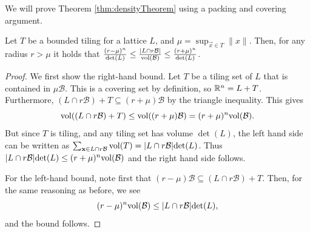 We will prove Theorem \ref{thm:densityTheorem} using a packing and covering argument. 



\begin{proposition}\label{prop:packingArgument} Let $T$ be a bounded tiling for a lattice $L$, and $\mu = \sup_{\vec x \in T} \|x\|$. Then, for any radius $r > \mu$ it holds that $\frac{ (r-\mu)^n}{\mathrm{det}(L)} \leq \frac {|L \cap r\mathcal B|} {\mathrm{vol}(\mathcal B)} \leq \frac{ (r+\mu)^n}{\mathrm{det}(L)}$.
\end{proposition}
\begin{proof} %
We first show the right-hand bound.
Let $T$ be a tiling set of $L$ that is contained in $\mu\mathcal{B}$.
This is a covering set by definition, so $\mathbb{R}^n = L + T$.
Furthermore, $(L \cap r\mathcal{B})+ T \subseteq (r+\mu)\mathcal{B}$ by the triangle inequality.
This gives \[\mathrm{vol}((L \cap r\mathcal{B})+ T) \leq \mathrm{vol}( (r+\mu)\mathcal{B}) = (r + \mu)^n \mathrm{vol} (\mathcal{B}).\]
But since $T$ is tiling, and any tiling set has volume $\det(L)$, the left hand side can be written as $\sum_{\mathbf{x} \in L \cap r\mathcal{B} } \mathrm{vol} (T) = |L \cap r\mathcal{B}| \mathrm{det}(L)$.
Thus $|L \cap r\mathcal{B}| \mathrm{det}(L) \leq  (r + \mu)^n \mathrm{vol} (\mathcal{B})$ and the right hand side follows.

For the left-hand bound, note first that $(r - \mu)\mathcal{B} \subseteq (L \cap r\mathcal{B})+ T$.
Then, for the same reasoning as before, we see
\[
(r-\mu)^n\mathrm{vol}(\mathcal{B}) \leq |L \cap r\mathcal{B}| \mathrm{det}(L),
\]
and the bound follows.
\end{proof}

